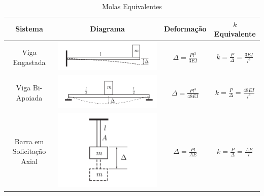 \documentclass{article}
\begin{document}
\begin{table}[h]
    \centering
    \begin{tabular}{|c|c|c|c|}
        \hline
        Sistema                    & Diagrama & Deformação & $k$ Equivalente \\ \hline
        Viga Engastada             &
        \begin{minipage}{.45\textwidth}
            \includegraphics[width=\linewidth]{imgs/mola_eq_1.png}
        \end{minipage}
                                   &
        $    \Delta = \frac{Pl^3}{3EI}$
                                   &
        $   k = \frac{P}{\Delta} = \frac{3EI}{l^3}$                          \\ \hline
        Viga Bi-Apoiada            &
        \begin{minipage}{.45\textwidth}
            \includegraphics[width=\linewidth]{imgs/mola_eq_2.png}
        \end{minipage}
                                   &
        $\Delta = \frac{Pl^3}{48EI}$
                                   &
        $k = \frac{P}{\Delta} = \frac{48EI}{l^3}$                            \\ \hline
        Barra em Solicitação Axial &
        \begin{minipage}{.45\textwidth}
            \centering
            \includegraphics[width=.5\linewidth]{imgs/mola_eq_3.png}
        \end{minipage}
                                   &
        $\Delta = \frac{Pl}{AE}$
                                   &
        $k = \frac{P}{\Delta} = \frac{AE}{l}$                                \\ \hline
    \end{tabular}
    \label{tab:molas_equivalentes}
    \caption{Molas Equivalentes}
\end{table}
\end{document}
